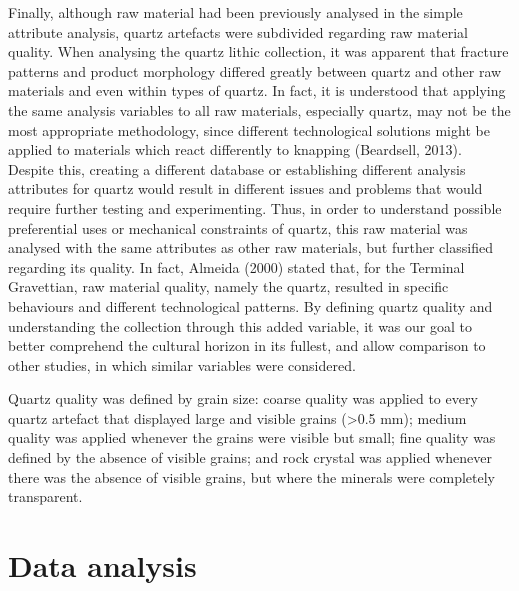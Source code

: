 \documentclass[12pt,twoside]{reedthesis}
\begin{document}
Finally, although raw material had been previously analysed in the simple attribute analysis, quartz artefacts were subdivided regarding raw material quality. When analysing the quartz lithic collection, it was apparent that fracture patterns and product morphology differed greatly between quartz and other raw materials and even within types of quartz. In fact, it is understood that applying the same analysis variables to all raw materials, especially quartz, may not be the most appropriate methodology, since different technological solutions might be applied to materials which react differently to knapping (Beardsell, 2013). Despite this, creating a different database or establishing different analysis attributes for quartz would result in different issues and problems that would require further testing and experimenting. Thus, in order to understand possible preferential uses or mechanical constraints of quartz, this raw material was analysed with the same attributes as other raw materials, but further classified regarding its quality. In fact, Almeida (2000) stated that, for the Terminal Gravettian, raw material quality, namely the quartz, resulted in specific behaviours and different technological patterns. By defining quartz quality and understanding the collection through this added variable, it was our goal to better comprehend the cultural horizon in its fullest, and allow comparison to other studies, in which similar variables were considered.

Quartz quality was defined by grain size: coarse quality was applied to every quartz artefact that displayed large and visible grains (\textgreater0.5 mm); medium quality was applied whenever the grains were visible but small; fine quality was defined by the absence of visible grains; and rock crystal was applied whenever there was the absence of visible grains, but where the minerals were completely transparent.

\hypertarget{data-analysis}{%
\section{Data analysis}\label{data-analysis}}
\end{document}
